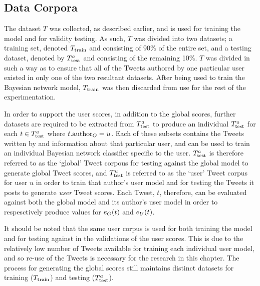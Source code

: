 \subsection{Data Corpora}
The dataset $T$ was collected, as described earlier, and is used for training the model and for validity testing. As such, $T$  was divided into two datasets; a training set, denoted $T_{\textrm{train}}{}$ and consisting of 90\% of the entire set, and a testing dataset, denoted by $T^a_{\textrm{test}}{}$ and consisting of the remaining 10\%. $T$ was divided in such a way as to ensure that all of the Tweets authored by one particular user existed in only one of the two resultant datasets. After being used to train the Bayesian network model, $T_{\textrm{train}}{}$ was then discarded from use for the rest of the experimentation.

In order to support the user scores, in addition to the global scores, further datasets are required to be extracted from $T^a_{\textrm{test}}{}$ to produce an individual $T_{\textrm{test}}^u$ for each $t \in T^a_{\textrm{test}}{}$ where $t.\textrm{author}_O = u$. Each of these subsets contains the Tweets written by and information about that particular user, and can be used to train an individual Bayesian network classifier specific to the user. $T^a_{\textrm{test}}{}$ is therefore referred to as the `global' Tweet corpous for testing against the global model to generate global Tweet scores, and $T_{\textrm{test}}^u$ is referred to as the `user' Tweet corpus for user $u$ in order to train that author's user model and for testing the Tweets it posts to generate \textit{user} Tweet scores. Each Tweet, $t$, therefore, can be evaluated against both the global model and its author's user model in order to respesctively produce values for $e_G(t)$ and $e_U(t)$.

It should be noted that the same user corpus is used for both training the model and for testing against in the validations of the user scores. This is due to the relatively low number of Tweets available for training each individual user model, and so re-use of the Tweets is necessary for the research in this chapter. The process for generating the global scores still maintains distinct datasets for training ($T_{\textrm{train}}{}$) and testing ($T^a_{\textrm{test}}{}$).


